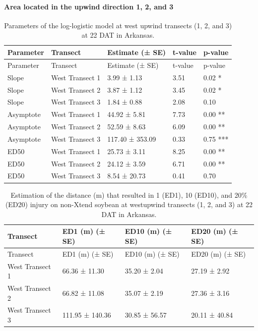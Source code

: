 \documentclass[]{article}
\let\oldparagraph\paragraph
\renewcommand{\paragraph}[1]{\oldparagraph{#1}\mbox{}}
\begin{document}
\paragraph{\texorpdfstring{Area located in the \textbf{upwind} direction
1, 2, and
3}{Area located in the upwind direction 1, 2, and 3}}\label{area-located-in-the-upwind-direction-1-2-and-3}

\begin{longtable}[]{@{}lllll@{}}
\caption{Parameters of the log-logistic model at west upwind transects
(1, 2, and 3) at 22 DAT in Arkansas.}\tabularnewline
\toprule
Parameter & Transect & Estimate (± SE) & t-value &
p-value\tabularnewline
\midrule
\endfirsthead
\toprule
Parameter & Transect & Estimate (± SE) & t-value &
p-value\tabularnewline
\midrule
\endhead
Slope & West Transect 1 & 3.99 ± 1.13 & 3.51 & 0.02 *\tabularnewline
Slope & West Transect 2 & 3.87 ± 1.12 & 3.45 & 0.02 *\tabularnewline
Slope & West Transect 3 & 1.84 ± 0.88 & 2.08 & 0.10\tabularnewline
Asymptote & West Transect 1 & 44.92 ± 5.81 & 7.73 & 0.00
**\tabularnewline
Asymptote & West Transect 2 & 52.59 ± 8.63 & 6.09 & 0.00
**\tabularnewline
Asymptote & West Transect 3 & 117.40 ± 353.09 & 0.33 & 0.75
***\tabularnewline
ED50 & West Transect 1 & 25.73 ± 3.11 & 8.25 & 0.00 **\tabularnewline
ED50 & West Transect 2 & 24.12 ± 3.59 & 6.71 & 0.00 **\tabularnewline
ED50 & West Transect 3 & 8.54 ± 20.73 & 0.41 & 0.70\tabularnewline
\bottomrule
\end{longtable}

\begin{longtable}[]{@{}llll@{}}
\caption{Estimation of the distance (m) that resulted in 1 (ED1), 10
(ED10), and 20\% (ED20) injury on non-Xtend soybean at westupwind
transects (1, 2, and 3) at 22 DAT in Arkansas.}\tabularnewline
\toprule
Transect & ED1 (m) (± SE) & ED10 (m) (± SE) & ED20 (m) (±
SE)\tabularnewline
\midrule
\endfirsthead
\toprule
Transect & ED1 (m) (± SE) & ED10 (m) (± SE) & ED20 (m) (±
SE)\tabularnewline
\midrule
\endhead
West Transect 1 & 66.36 ± 11.30 & 35.20 ± 2.04 & 27.19 ±
2.92\tabularnewline
West Transect 2 & 66.82 ± 11.08 & 35.07 ± 2.19 & 27.36 ±
3.16\tabularnewline
West Transect 3 & 111.95 ± 140.36 & 30.85 ± 56.57 & 20.11 ±
40.84\tabularnewline
\bottomrule
\end{longtable}
\end{document}
